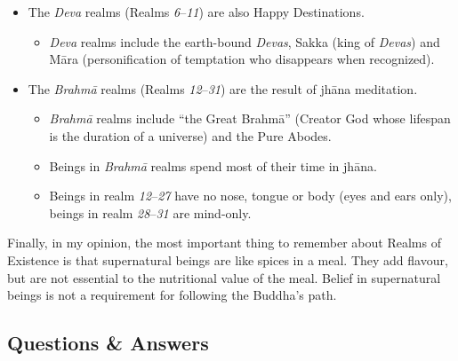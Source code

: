 \begin{itemize}
\begin{itemize}
\begin{itemize}
\end{itemize}

\end{itemize}

\item The \textit{Deva} realms (Realms \textit{6}--\textit{11}) are also Happy Destinations.

\begin{itemize}

\item \textit{Deva} realms include the earth-bound \textit{Devas}, Sakka (king of \textit{Devas}) and Māra (personification of temptation who disappears when recognized).

\end{itemize}

\item The \textit{Brahmā} realms (Realms \textit{12}--\textit{31}) are the result of jhāna meditation.

\begin{itemize}

\item \textit{Brahmā} realms include “the Great Brahmā” (Creator God whose lifespan is the duration of a universe) and the Pure Abodes.

\item Beings in \textit{Brahmā} realms spend most of their time in jhāna.

\item Beings in realm \textit{12}--\textit{27} have no nose, tongue or body (eyes and ears only), beings in realm \textit{28}--\textit{31} are mind-only.

\end{itemize}

\end{itemize}

Finally, in my opinion, the most important thing to remember about Realms of Existence is that supernatural beings are like spices in a meal. They add flavour, but are not essential to the nutritional value of the meal. Belief in supernatural beings is not a requirement for following the Buddha’s path.

\newpage

\subsection*{Questions \& Answers}


